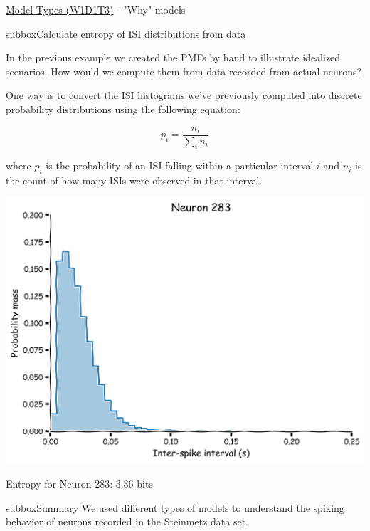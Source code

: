 \begin{textbox}{\href{https://compneuro.neuromatch.io/tutorials/W1D1_ModelTypes/student/W1D1_Tutorial3.html}{Model Types (W1D1T3)} -  "Why" models}


\begin{subbox}{subbox}{Calculate entropy of ISI distributions from data
}
\scriptsize


In the previous example we created the PMFs by hand to illustrate idealized scenarios. How would we compute them from data recorded from actual neurons?

One way is to convert the ISI histograms we've previously computed into discrete probability distributions using the following equation:

\begin{equation}
p_i = \frac{n_i}{\sum\nolimits_{i}n_i}
\end{equation}

where $p_i$ is the probability of an ISI falling within a particular interval $i$ and $n_i$ is the count of how many ISIs were observed in that interval.

\begin{center}
    
\includegraphics[scale=0.1]{Figures/MT/MT_Figure9.png}
\end{center}
Entropy for Neuron 283: 3.36 bits

\end{subbox}

\begin{subbox}{subbox}{Summary}
\scriptsize
We used different types of models to understand the spiking behavior of neurons recorded in the Steinmetz data set. 


\end{subbox}
\end{textbox}
